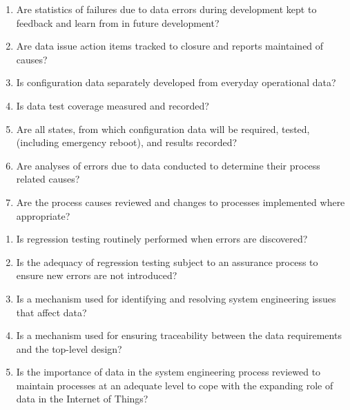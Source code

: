 \begin{enumerate}
  \item Are statistics of failures due to data errors during development kept to feedback and learn from in future development?
  \item Are data issue action items tracked to closure and reports maintained of causes?
  \item Is configuration data separately developed from everyday operational data?
  \item Is data test coverage measured and recorded?
  \item Are all states, from which configuration data will be required, tested, (including emergency reboot), and results recorded?
  \item Are analyses of errors due to data conducted to determine their process related causes?
  \item Are the process causes reviewed and changes to processes implemented where appropriate?
\end{enumerate}

\begin{enumerate}
  \item Is regression testing routinely performed when errors are discovered?
  \item Is the adequacy of regression testing subject to an assurance process to ensure new errors are not introduced?
  \item Is a mechanism used for identifying and resolving system engineering issues that affect data?
  \item Is a mechanism used for ensuring traceability between the data requirements and the top-level design?
  \item Is the importance of data in the system engineering process reviewed to maintain processes at an adequate level to cope with the expanding role of data in the Internet of Things? 
\end{enumerate}
